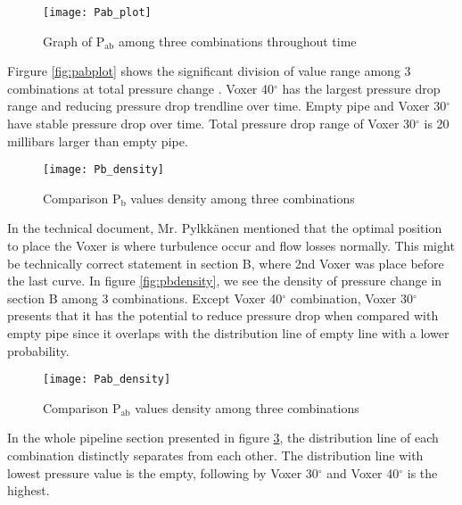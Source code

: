 \begin{figure}[h]
  \centering
  \texttt{[image: Pab\_plot]}
  \caption{ Graph of P$_{\text{ab}}$ among three combinations throughout time}
  \label{fig:pabplot}
\end{figure}

Firgure \vref{fig:pabplot} shows the significant division of value range among 3 combinations at total pressure change . Voxer 40$^{\circ}$  has the largest pressure drop range and reducing pressure drop trendline over time. Empty pipe and Voxer 30$^{\circ}$ have stable pressure drop over time. Total pressure drop range of Voxer 30$^{\circ}$ is 20 millibars larger than empty pipe. 

\begin{figure}[h]
  \centering
  \texttt{[image: Pb\_density]}
  \caption{ Comparison P$_{\text{b}}$ values density among three combinations}
  \label{fig:pbdensity}
\end{figure}

In the technical document, Mr. Pylkkänen mentioned that the optimal position to place the Voxer is where turbulence occur and flow losses normally. This might be technically correct statement in section B, where 2nd Voxer was place before the last curve. In figure \vref{fig:pbdensity}, we see the density of pressure change in section B among 3 combinations. Except Voxer 40$^{\circ}$ combination, Voxer 30$^{\circ}$ presents that it has the potential to reduce pressure drop when compared with empty pipe since it overlaps with the distribution line of empty line with a lower probability.  

\begin{figure}[h]
  \centering
  \texttt{[image: Pab\_density]}
  \caption{ Comparison P$_{\text{ab}}$ values density among three combinations}
  \label{fig:pabdensity}
\end{figure}

In the whole pipeline section presented in figure \ref{fig:pabdensity}, the distribution line of each combination distinctly separates from each other. The distribution line with lowest pressure value is the empty, following by Voxer 30$^{\circ}$ and Voxer 40$^{\circ}$  is the highest.
\clearpage %
